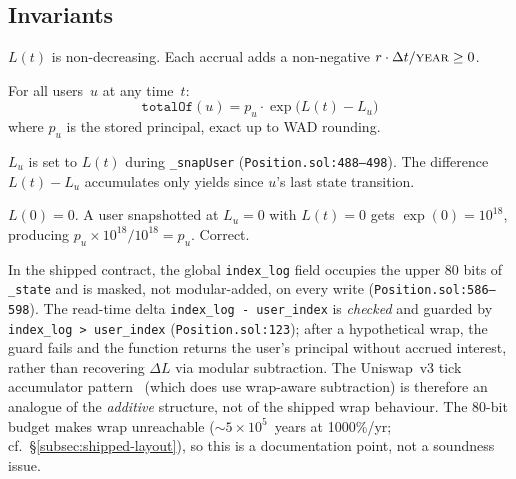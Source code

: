 \documentclass[10pt,a4paper,twocolumn]{article}
\begin{document}
\subsection{Invariants}
\label{subsec:invariants}

\begin{property}[Monotonicity]
\label{prop:monotone}
$L(t)$ is non-decreasing. Each accrual adds a non-negative $r \cdot \Delta t / \textsc{year} \geq 0$.
\end{property}

\begin{property}[Conservation]
\label{prop:conservation}
For all users~$u$ at any time~$t$:
\begin{equation}
\texttt{totalOf}(u) = p_u \cdot \exp\bigl(L(t) - L_u\bigr)
\end{equation}
where $p_u$ is the stored principal, exact up to WAD rounding.
\end{property}

\begin{property}
\label{prop:snapshot}
$L_u$ is set to $L(t)$ during \texttt{\_snapUser} (\texttt{Position.sol:488--498}). The difference $L(t) - L_u$ accumulates only yields since $u$'s last state transition.
\end{property}

\begin{property}
\label{prop:zero-start}
$L(0) = 0$. A user snapshotted at $L_u = 0$ with $L(t) = 0$ gets $\exp(0) = 10^{18}$, producing $p_u \times 10^{18} / 10^{18} = p_u$. Correct.
\end{property}

\begin{remark}
\label{rem:modular}
In the shipped contract, the global \texttt{index\_log} field occupies the upper 80 bits of \texttt{\_state} and is masked, not modular-added, on every write (\texttt{Position.sol:586--598}). The read-time delta \texttt{index\_log - user\_index} is \emph{checked} and guarded by \texttt{index\_log > user\_index} (\texttt{Position.sol:123}); after a hypothetical wrap, the guard fails and the function returns the user's principal without accrued interest, rather than recovering $\Delta L$ via modular subtraction. The Uniswap~v3 tick accumulator pattern~\cite{uniswap2021} (which does use wrap-aware subtraction) is therefore an analogue of the \emph{additive} structure, not of the shipped wrap behaviour. The 80-bit budget makes wrap unreachable (${\sim}5 \times 10^5$~years at 1000\%/yr; cf.\ \S\ref{subsec:shipped-layout}), so this is a documentation point, not a soundness issue.
\end{remark}
\end{document}
